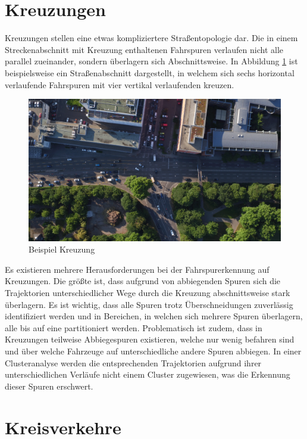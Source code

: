 \section{Kreuzungen}


Kreuzungen stellen eine etwas kompliziertere Straßentopologie dar. Die in einem Streckenabschnitt mit
Kreuzung enthaltenen Fahrspuren verlaufen nicht alle parallel zueinander, sondern überlagern sich
Abschnittsweise. In Abbildung \ref{fig:topos_crossroad} ist beispielsweise ein Straßenabschnitt dargestellt,
in welchem sich sechs horizontal verlaufende Fahrspuren mit vier vertikal verlaufenden kreuzen.

\begin{figure}[H]
\centering
    \includegraphics[width=0.5\linewidth]{resources/img/umsetzung/U1/Neckartor_Aufnahme}
\caption{Beispiel Kreuzung}
\label{fig:topos_crossroad}
\end{figure}

Es existieren mehrere Herausforderungen bei der Fahrspurerkennung auf Kreuzungen. Die größte ist, dass
aufgrund von abbiegenden Spuren sich die Trajektorien unterschiedlicher Wege durch die Kreuzung
abschnittsweise stark überlagern. Es ist wichtig, dass alle Spuren trotz Überschneidungen zuverlässig
identifiziert werden und in Bereichen, in welchen sich mehrere Spuren überlagern, alle bis auf eine
partitioniert werden. Problematisch ist zudem, dass in Kreuzungen teilweise Abbiegespuren existieren,
welche nur wenig befahren sind und über welche Fahrzeuge auf unterschiedliche andere Spuren abbiegen.
In einer Clusteranalyse werden die entsprechenden Trajektorien aufgrund ihrer unterschiedlichen Verläufe
nicht einem Cluster zugewiesen, was die Erkennung dieser Spuren erschwert.

\section{Kreisverkehre}

